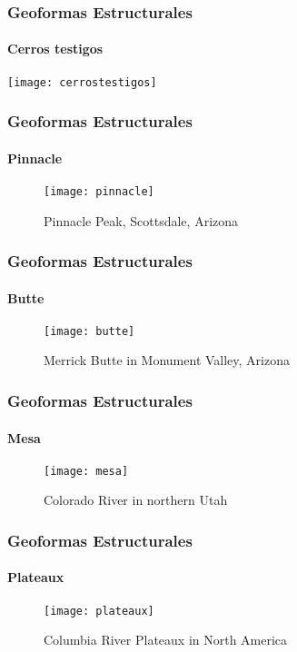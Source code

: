 \documentclass{beamer}
\begin{document}
\begin{frame}
\frametitle{Geoformas Estructurales}
\framesubtitle{Cerros testigos}
\begin{center}
\texttt{[image: cerrostestigos]}
\end{center}
\end{frame}
\begin{frame}
\frametitle{Geoformas Estructurales}
\framesubtitle{Pinnacle}
\begin{figure}
\begin{center}
\texttt{[image: pinnacle]}
\caption{Pinnacle Peak, Scottsdale, Arizona}
\end{center}
\end{figure}
\end{frame}
\begin{frame}
\frametitle{Geoformas Estructurales}
\framesubtitle{Butte}
\begin{figure}
\begin{center}
\texttt{[image: butte]}
\caption{Merrick Butte in Monument Valley, Arizona}
\end{center}
\end{figure}
\end{frame}
\begin{frame}
\frametitle{Geoformas Estructurales}
\framesubtitle{Mesa}
\begin{figure}
\begin{center}
\texttt{[image: mesa]}
\caption{Colorado River in northern Utah}
\end{center}
\end{figure}
\end{frame}
\begin{frame}
\frametitle{Geoformas Estructurales}
\framesubtitle{Plateaux}
\begin{figure}
\begin{center}
\texttt{[image: plateaux]}
\caption{Columbia River Plateaux in North America}
\end{center}
\end{figure}
\end{frame}
\end{document}
